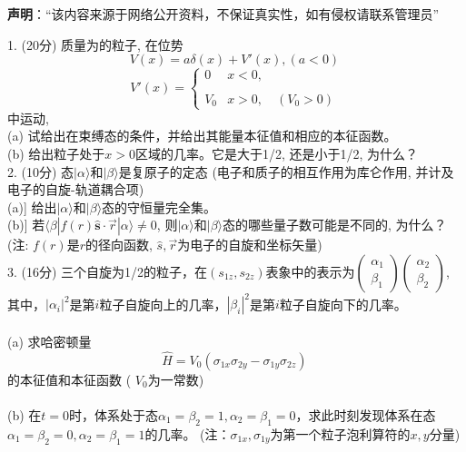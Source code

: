 
\textbf{声明}：“该内容来源于网络公开资料，不保证真实性，如有侵权请联系管理员”

1. (20分) 质量为的粒子, 在位势
$$V(x) = a \delta (x) + V'(x), (a < 0)~$$
$$V'(x) = \begin{cases} 0 & x < 0, \\\\ V_0 & x > 0,\quad (V_0 > 0)\end{cases}~$$
中运动,\\
(a) 试给出在束缚态的条件，并给出其能量本征值和相应的本征函数。\\
(b) 给出粒子处于$ x > 0 $区域的几率。它是大于1/2, 还是小于1/2, 为什么？\\

2. (10分) 态$|\alpha\rangle$和$|\beta\rangle$是复原子的定态 (电子和质子的相互作用为库仑作用, 并计及电子的自旋-轨道耦合项)\\
(a)] 给出$|\alpha\rangle$和$|\beta\rangle$态的守恒量完全集。\\
(b)] 若$\langle \beta | f({r}) \hat{\mathbf{s}} \cdot \vec{r} | \alpha \rangle \neq 0$, 则$|\alpha\rangle$和$|\beta\rangle$态的哪些量子数可能是不同的, 为什么？\\
(注: $f({r})$是$r$的径向函数, $\hat{s},\vec{r}$为电子的自旋和坐标矢量)\\

3. (16分) 三个自旋为1/2的粒子，在$(s_{1z}, s_{2z})$表象中的表示为$\begin{pmatrix} \alpha_1 \\ \beta_1 \end{pmatrix} \begin{pmatrix} \alpha_2 \\ \beta_2 \end{pmatrix}$, 其中，$\left|\alpha_i\right|^2$是第$i$粒子自旋向上的几率，$\left|\beta_i\right|^2$是第$i$粒子自旋向下的几率。\\\\
(a) 求哈密顿量 
$$\hat{H} = V_0 (\sigma_{1x} \sigma_{2y} - \sigma_{1y} \sigma_{2z})~$$
    的本征值和本征函数 ( $V_0$为一常数)\\\\
(b) 在$t=0$时，体系处于态$\alpha_1 = \beta_2 = 1, \alpha_2 = \beta_1 = 0$，求此时刻发现体系在态$\alpha_1 = \beta_2 = 0, \alpha_2 = \beta_1 = 1$的几率。
    (注：$\sigma_{1x}, \sigma_{1y}$为第一个粒子泡利算符的$x,y$分量)